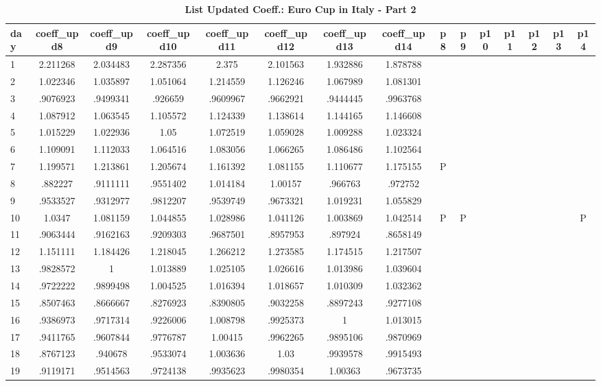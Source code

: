 \documentclass[a4paper,12pt]{article}
\begin{document}
\begin{landscape}
\begin{footnotesize}
\begin{center}
\begin{longtable}{lcccccccccccccc|}
\caption{\textbf{List Updated Coeff.: Euro Cup in Italy - Part 2}\label{tab_it_3b}}
\hline
day&coeff\_upd8&coeff\_upd9&coeff\_upd10&coeff\_upd11&coeff\_upd12&coeff\_upd13&coeff\_upd14&p8&p9&p10&p11&p12&p13&p14 \\ \hline
1&2.211268&2.034483&2.287356&2.375&2.101563&1.932886&1.878788&&&&&&& \\
2&1.022346&1.035897&1.051064&1.214559&1.126246&1.067989&1.081301&&&&&&& \\
3&.9076923&.9499341&.926659&.9609967&.9662921&.9444445&.9963768&&&&&&& \\
4&1.087912&1.063545&1.105572&1.124339&1.138614&1.144165&1.146608&&&&&&& \\
5&1.015229&1.022936&1.05&1.072519&1.059028&1.009288&1.023324&&&&&&& \\
6&1.109091&1.112033&1.064516&1.083056&1.066265&1.086486&1.102564&&&&&&& \\
7&1.199571&1.213861&1.205674&1.161392&1.081155&1.110677&1.175155&P&&&&&& \\
8&.882227&.9111111&.9551402&1.014184&1.00157&.966763&.972752&&&&&&& \\
9&.9533527&.9312977&.9812207&.9539749&.9673321&1.019231&1.055829&&&&&&& \\
10&1.0347&1.081159&1.044855&1.028986&1.041126&1.003869&1.042514&P&P&&&&&P \\
11&.9063444&.9162163&.9209303&.9687501&.8957953&.897924&.8658149&&&&&&& \\
12&1.151111&1.184426&1.218045&1.266212&1.273585&1.174515&1.217507&&&&&&& \\
13&.9828572&1&1.013889&1.025105&1.026616&1.013986&1.039604&&&&&&& \\
14&.9722222&.9899498&1.004525&1.016394&1.018657&1.010309&1.032362&&&&&&& \\
15&.8507463&.8666667&.8276923&.8390805&.9032258&.8897243&.9277108&&&&&&& \\
16&.9386973&.9717314&.9226006&1.008798&.9925373&1&1.013015&&&&&&& \\
17&.9411765&.9607844&.9776787&1.00415&.9962265&.9895106&.9870969&&&&&&& \\
18&.8767123&.940678&.9533074&1.003636&1.03&.9939578&.9915493&&&&&&& \\
19&.9119171&.9514563&.9724138&.9935623&.9980354&1.00363&.9673735&&&&&&& \\

\end{longtable}
\end{center}
\end{footnotesize}
\end{landscape}
\end{document}

